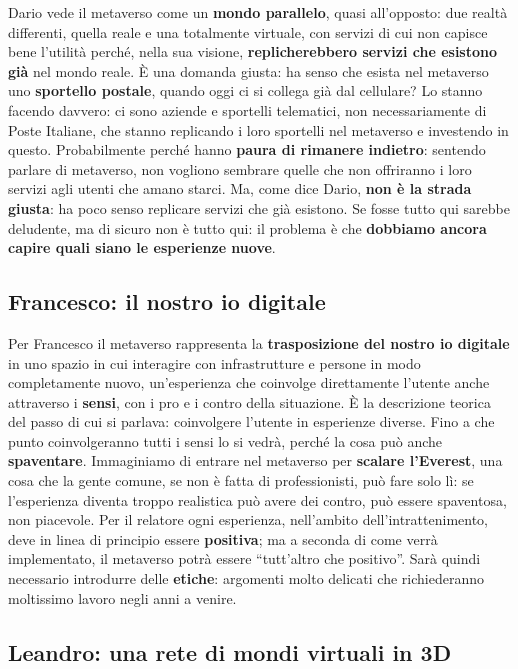 Dario vede il metaverso come un \textbf{mondo parallelo}, quasi all'opposto: due
realtà differenti, quella reale e una totalmente virtuale, con servizi di cui non
capisce bene l'utilità perché, nella sua visione, \textbf{replicherebbero servizi
che esistono già} nel mondo reale. È una domanda giusta: ha senso che esista nel
metaverso uno \textbf{sportello postale}, quando oggi ci si collega già dal
cellulare? Lo stanno facendo davvero: ci sono aziende e sportelli telematici, non
necessariamente di Poste Italiane, che stanno replicando i loro sportelli nel
metaverso e investendo in questo. Probabilmente perché hanno \textbf{paura di
rimanere indietro}: sentendo parlare di metaverso, non vogliono sembrare quelle
che non offriranno i loro servizi agli utenti che amano starci. Ma, come dice
Dario, \textbf{non è la strada giusta}: ha poco senso replicare servizi che già
esistono. Se fosse tutto qui sarebbe deludente, ma di sicuro non è tutto qui: il
problema è che \textbf{dobbiamo ancora capire quali siano le esperienze nuove}.

\subsection{Francesco: il nostro io digitale}

Per Francesco il metaverso rappresenta la \textbf{trasposizione del nostro io
digitale} in uno spazio in cui interagire con infrastrutture e persone in modo
completamente nuovo, un'esperienza che coinvolge direttamente l'utente anche
attraverso i \textbf{sensi}, con i pro e i contro della situazione. È la
descrizione teorica del passo di cui si parlava: coinvolgere l'utente in
esperienze diverse. Fino a che punto coinvolgeranno tutti i sensi lo si vedrà,
perché la cosa può anche \textbf{spaventare}. Immaginiamo di entrare nel
metaverso per \textbf{scalare l'Everest}, una cosa che la gente comune, se non è
fatta di professionisti, può fare solo lì: se l'esperienza diventa troppo
realistica può avere dei contro, può essere spaventosa, non piacevole. Per il
relatore ogni esperienza, nell'ambito dell'intrattenimento, deve in linea di
principio essere \textbf{positiva}; ma a seconda di come verrà implementato, il
metaverso potrà essere ``tutt'altro che positivo''. Sarà quindi necessario
introdurre delle \textbf{etiche}: argomenti molto delicati che richiederanno
moltissimo lavoro negli anni a venire.

\subsection{Leandro: una rete di mondi virtuali in 3D}

